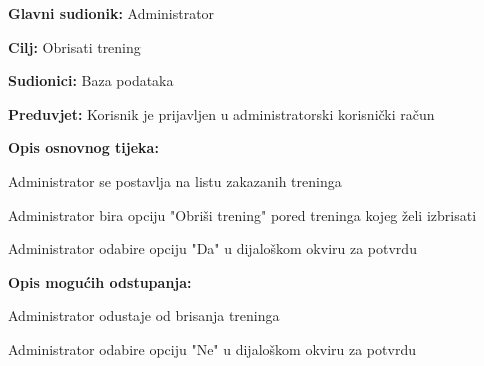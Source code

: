 		\noindent {}
		\begin{packed_item}
			
			\item \textbf{Glavni sudionik: } Administrator
			\item  \textbf{Cilj: } Obrisati trening
			\item  \textbf{Sudionici: } Baza podataka
			\item  \textbf{Preduvjet: } Korisnik je prijavljen u administratorski korisnički račun
			\item  \textbf{Opis osnovnog tijeka:}
			
			\item[] \begin{packed_enum}
				
				\item Administrator se postavlja na listu zakazanih treninga
				\item Administrator bira opciju "Obriši trening" pored treninga kojeg želi izbrisati
				\item Administrator odabire opciju "Da" u dijaloškom okviru za potvrdu
			\end{packed_enum}
			
			\item  \textbf{Opis mogućih odstupanja:}
			
			\item[] \begin{packed_item}
				
				\item[2.a] Administrator odustaje od brisanja treninga
				\item[] \begin{packed_enum}
					
					\item Administrator odabire opciju "Ne" u dijaloškom okviru za potvrdu
					
				\end{packed_enum}
			\end{packed_item}
			
		\end{packed_item}
	
